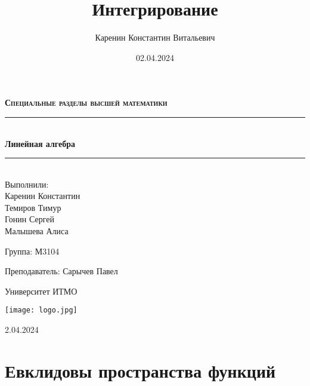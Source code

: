 \documentclass{article}
\title{Интегрирование}
\author{Каренин Константин Витальевич}
\date{02.04.2024}
\begin{document}
\begin{titlepage}
    \centering
    \vspace*{0.5 cm}
    
    \textsc{\LARGE \textbf{Специальные разделы высшей математики}}
    \vspace{1.5cm}
    
    \rule{\linewidth}{0.2 mm} \\[0.4 cm]
    { \huge \bfseries Линейная алгебра}
    \rule{\linewidth}{0.2 mm} \\[1.5 cm]
    
    \Large Выполнили: \\
    Каренин Константин \\
    Темиров Тимур \\
    Гонин Сергей \\
    Малышева Алиса \\
    
    \vspace{0.5cm}
    
    Группа: М3104
    
    \vspace{0.5cm}
    
    Преподаватель: Сарычев Павел
    
    \vspace{0.5cm}
    
    Университет ИТМО
    
    \vfill

    \texttt{[image: logo.jpg]}
    
    2.04.2024
    
\end{titlepage}

\setcounter{page}{2}

\newpage
    \section{Евклидовы пространства функций}
    \subsection{}
\end{document}
